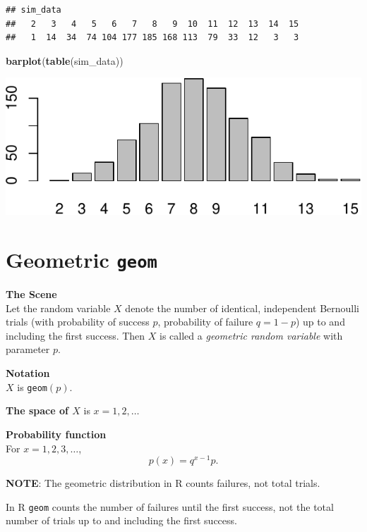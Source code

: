\documentclass[
]{book}
\newenvironment{Shaded}{\begin{snugshade}}{\end{snugshade}}
\newcommand{\FunctionTok}[1]{\textcolor[rgb]{0.13,0.29,0.53}{\textbf{#1}}}
\newcommand{\NormalTok}[1]{#1}
\theoremstyle{definition}
\theoremstyle{definition}
\theoremstyle{definition}
\theoremstyle{definition}
\theoremstyle{remark}
\begin{document}
\begin{verbatim}
## sim_data
##   2   3   4   5   6   7   8   9  10  11  12  13  14  15 
##   1  14  34  74 104 177 185 168 113  79  33  12   3   3
\end{verbatim}

\begin{Shaded}
\begin{Highlighting}[]
\FunctionTok{barplot}\NormalTok{(}\FunctionTok{table}\NormalTok{(sim\_data))}
\end{Highlighting}
\end{Shaded}

\includegraphics{math340-notes_files/figure-latex/unnamed-chunk-137-1.pdf}

\section{\texorpdfstring{Geometric \texttt{geom}}{Geometric geom}}\label{geometricR}

\textbf{The Scene}\\
Let the random variable \(X\) denote the number of identical, independent Bernoulli trials (with probability of success \(p\), probability of failure \(q = 1-p\)) up to and including the first success.
Then \(X\) is called a \emph{geometric random variable} with parameter \(p\).

\textbf{Notation}\\
\(X\) is \texttt{geom}\((p)\).

\textbf{The space of \(X\)} is \(x = 1, 2, \ldots\)

\textbf{Probability function}\\
For \(x = 1, 2, 3, \ldots\), \[p(x)= q^{x-1}p.\]

\textbf{NOTE}: The geometric distribution in R counts failures, not total trials.

In R \texttt{geom} counts the number of failures until the first success, not the total number of trials up to and including the first success.
\end{document}
